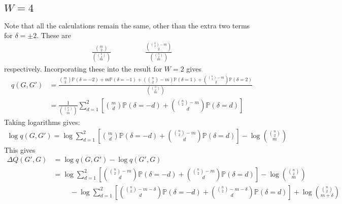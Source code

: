 \documentclass[12pt,a4paper]{article}
\theoremstyle{definition}
\renewcommand{\P}{\mathbb{P}}
\newcommand{\lchoose}[2]{\binom{#1}{#2}}
\begin{document}
\subsection{\(W=4\)}
Note that all the calculations remain the same, other than the extra two terms for \(\delta = \pm 2\). These are 
\begin{align*}
\frac{\binom{m}{2}}{\binom{\lchoose{n}{2}}{m}}\qquad\qquad & \frac{\binom{\lchoose{n}{2}-m}{2}}{\binom{\lchoose{n}{2}}{m}}
\end{align*}
respectively.
Incorporating these into the result for \(W=2\) gives 
\begin{align*} 
q(G,G')
&=\frac{\binom{m}{2}\P(\delta=-2)+m\P(\delta=-1)+(\lchoose{n}{2}-m)\P(\delta=1)+\binom{\lchoose{n}{2}-m}{2}\P(\delta=2)}{\binom{\lchoose{n}{2}}{m}}\\[0.4em]
&= \frac{1}{\binom{\lchoose{n}{2}}{m}}\sum_{d=1}^2\left[\binom{m}{d}\P(\delta=-d)+\binom{\lchoose{n}{2}-m}{d}\P(\delta=d)\right]
\end{align*}
Taking logarithms gives:
\begin{align*}
\log q(G,G')= \log\sum_{d=1}^2\left[\binom{m}{d}\P(\delta=-d)+\binom{\lchoose{n}{2}-m}{d}\P(\delta=d)\right] - \log \binom{\lchoose{n}{2}}{m}
\end{align*}
This gives \begin{align*}
\Delta Q(G',G) &= \log q(G,G')-\log q(G',G)\\
&=\log\sum_{d=1}^2\left[\binom{\lchoose{n}{2}-m}{d}\P(\delta=-d)+\binom{\lchoose{n}{2}-m}{d}\P(\delta=d)\right] - \log \binom{\lchoose{n}{2}}{m}\\&\hspace{1cm}-\log\sum_{d=1}^2\left[\binom{\lchoose{n}{2}-m-\delta}{d}\P(\delta=-d)+\binom{\lchoose{n}{2}-m-\delta}{d}\P(\delta=d)\right] + \log \binom{\lchoose{n}{2}}{m+\delta}
\end{align*}
\end{document}
